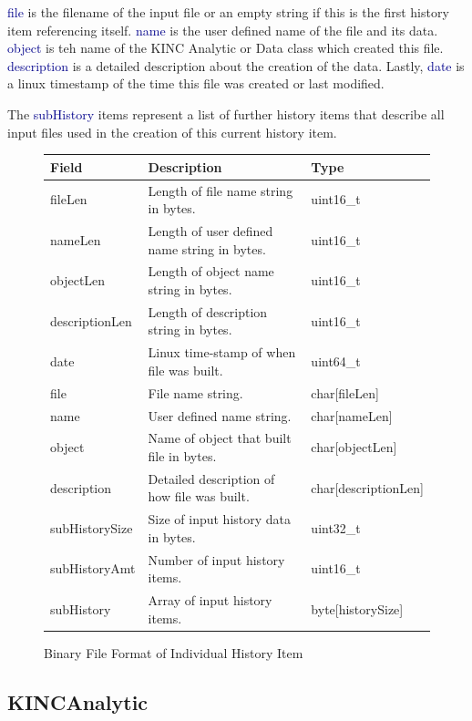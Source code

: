 \documentclass[10pt]{article}
\providecommand{\h}[1]{\textcolor{darkblue}{#1}}
\begin{document}
\h{file} is the filename of the input file or an empty string if this is the 
first history item referencing itself. \h{name} is the user defined name of the 
file and its data. \h{object} is teh name of the KINC Analytic or Data class 
which created this file. \h{description} is a detailed description about the 
creation of the data. Lastly, \h{date} is a linux timestamp of the time this 
file was created or last modified.

The \h{subHistory} items represent a list of further history items that 
describe all input files used in the creation of this current history item.

\begin{figure}[H]
\centering
\begin{tabularx}{\textwidth}{|l|X|l|}
\hline
\textbf{Field} & \textbf{Description} & \textbf{Type} \\
\hline
fileLen & Length of file name string in bytes. & uint16\_t \\
\hline
nameLen & Length of user defined name string in bytes. & uint16\_t \\
\hline
objectLen & Length of object name string in bytes. & uint16\_t \\
\hline
descriptionLen & Length of description string in bytes. & uint16\_t \\
\hline
date & Linux time-stamp of when file was built. & uint64\_t \\
\hline
file & File name string. & char[fileLen] \\
\hline
name & User defined name string. & char[nameLen] \\
\hline
object & Name of object that built file in bytes. & char[objectLen] \\
\hline
description & Detailed description of how file was built. & 
char[descriptionLen] \\
\hline
subHistorySize & Size of input history data in bytes. & uint32\_t \\
\hline
subHistoryAmt & Number of input history items. & uint16\_t \\
\hline
subHistory & Array of input history items. & byte[historySize] \\
\hline
\end{tabularx}
\caption{Binary File Format of Individual History Item}
\label{fig:kincdata:history}
\end{figure}

\subsection{KINCAnalytic}
\end{document}
